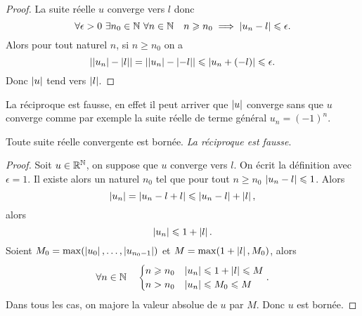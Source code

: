 \begin{proof}
  La suite réelle \(u\) converge vers \(l\) donc
  \begin{equation}
    \forall \epsilon>0 \ \exists n_0 \in \mathbb{N} \ \forall n \in \mathbb{N} \quad n\geqslant 
    n_0 \implies \left\lvert u_n-l\right\rvert\leqslant \epsilon.
  \end{equation}
  Alors pour tout naturel \(n\), si \(n\geqslant n_0\) on a
  \begin{equation}
    \left\lvert\left\lvert u_n\right\rvert-\left\lvert l\right\rvert\right\rvert = \left\lvert\left\lvert u_n\right\rvert-\left\lvert-l\right\rvert\right\rvert\leqslant 
    \left\lvert u_n+(-l)\right\rvert\leqslant \epsilon.
  \end{equation}
  Donc \(\left\lvert u\right\rvert\) tend vers \(\left\lvert l\right\rvert\).
\end{proof}
La réciproque est fausse, en effet il peut arriver que \(\left\lvert u\right\rvert\) converge sans 
que \(u\) converge comme par exemple la suite réelle de terme général \(u_n = 
(-1)^n\).
\begin{prop}
  Toute suite réelle convergente est bornée. \emph{La réciproque est fausse}.
\end{prop}
\begin{proof}
  Soit \(u\in \mathbb{R}^{\mathbb{N}}\), on suppose que \(u\) converge vers \(l\). On écrit la 
  définition avec \(\epsilon = 1\). Il existe alors un naturel \(n_0\) tel que 
  pour tout \(n\geqslant n_0\) \(\left\lvert u_n-l\right\rvert\leqslant 1\). Alors
  \begin{equation}
    \left\lvert u_n\right\rvert = \left\lvert u_n-l+l\right\rvert\leqslant \left\lvert u_n-l\right\rvert+\left\lvert l\right\rvert,
  \end{equation}
  alors
  \begin{equation}
    \left\lvert u_n\right\rvert\leqslant 1+\left\lvert l\right\rvert.
  \end{equation}
  Soient \(M_0 = \max(\left\lvert u_0\right\rvert,\ldots,\left\lvert u_{n_0-1}\right\rvert)\) et \(M = 
  \max(1+\left\lvert l\right\rvert,M_0)\), alors
  \begin{equation}
    \forall n \in \mathbb{N} \quad
    \begin{cases}
      n \geqslant n_0 & \left\lvert u_n\right\rvert\leqslant 1+\left\lvert l\right\rvert\leqslant M \\
      n>n_0 & \left\lvert u_n\right\rvert\leqslant M_0\leqslant M
    \end{cases}.
  \end{equation}
  Dans tous les cas, on majore la valeur absolue de \(u\) par \(M\). Donc \(u\) 
  est bornée.
\end{proof}

